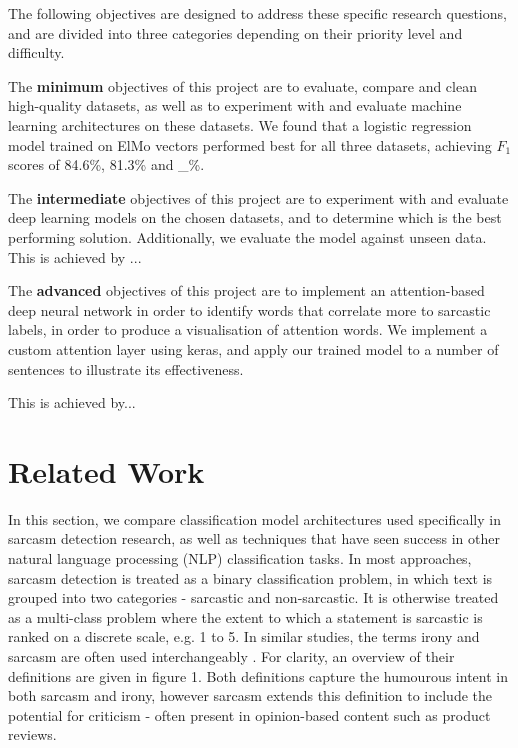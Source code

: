 \documentclass[12pt,a4paper]{article}
\begin{document}
\noindent The following objectives are designed to address these specific research questions, and are divided into three categories depending on their priority level and difficulty.

The \textbf{minimum} objectives of this project are to evaluate, compare and clean high-quality datasets, as well as to experiment with and evaluate machine learning architectures on these datasets. We found that a logistic regression model trained on ElMo vectors performed best for all three datasets, achieving $F_{1}$ scores of 84.6\%, 81.3\% and \_\%. 

The \textbf{intermediate} objectives of this project are to experiment with and evaluate deep learning models on the chosen datasets, and to determine which is the best performing solution. Additionally, we evaluate the model against unseen data. This is achieved by ...

The \textbf{advanced} objectives of this project are to implement an attention-based deep neural network in order to identify words that correlate more to sarcastic labels, in order to produce a visualisation of attention words. We implement a custom attention layer using keras, and apply our trained model to a number of sentences to illustrate its effectiveness.

This is achieved by...





\vfill

\section{Related Work}
\noindent In this section, we compare classification model architectures used specifically in sarcasm detection research, as well as techniques that have seen success in other natural language processing (NLP) classification tasks. In most approaches, sarcasm detection is treated as a binary classification problem, in which text is grouped into two categories - sarcastic and non-sarcastic. It is otherwise treated as a multi-class problem where the extent to which a statement is sarcastic is ranked on a discrete scale, e.g. 1 to 5. 
In similar studies, the terms irony and sarcasm are often used interchangeably \cite{tsur2010icwsm}. For clarity, an overview of their definitions are given in figure 1. Both definitions capture the humourous intent in both sarcasm and irony, however sarcasm extends this definition to include the potential for criticism - often present in opinion-based content such as product reviews.
\end{document}

